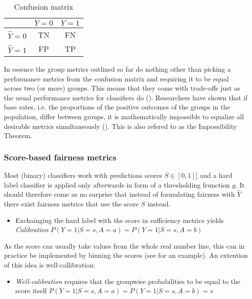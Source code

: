 \begin{table}
    \centering
    \begin{tabular}{|c|c|c|}
        \hline
        & \(Y = 0\) & \(Y = 1\) \\
        \hline
        \(\hat{Y} = 0\) & TN & FN \\
        \hline
        \(\hat{Y} = 1\) & FP & TP \\
        \hline
    \end{tabular}
    \caption{Confusion matrix}
    \label{tab:confusion_matrix}
\end{table}

In essence the group metrics outlined so far do nothing other than picking a performance metrics from the confusion matrix and requiring it to be equal across two (or more) groups.
This means that they come with trade-offs just as the usual performance metrics for classifiers do (\cite{kleinberg2017}). Researchers have shown that if base rates, i.e. the proportions of the positive outcomes of the groups in the population, differ between groups, it is mathematically impossible to equalize all desirable metrics simultaneously (\cite{Chouldechova2016FairPW}). This is also refered to as the Impossibility Theorem.

\subsubsection*{Score-based fairness metrics}
Most (binary) classifiers work with predictions scores $S \in [0,1]]$ and a hard label classifier is applied only afterwards in form of a thresholding frunction $g$. It should therefore come as no surprise that instead of formulating fairness with $\hat{Y}$ there exist fairness metrics that use the score $S$ instead.
\begin{itemize}
    \item Exchainging the hard label with the score in sufficiency metrics yields \textit{Calibration} $P(Y = 1 | S = s, A = a) = P(Y = 1 | S = s, A = b)$
\end{itemize}
As the score can usually take values from the whole real number line, this can in practice be implemented by binning the scores (see \cite{verma2018} for an example). An extention of this idea is well-callibration:
\begin{itemize}
    \item \textit{Well-calibration} requires that the groupwise probabilities to be equal to the score itself $P(Y = 1 | S = s, A = a) = P(Y = 1 | S = s, A = b) = s$
\end{itemize}

